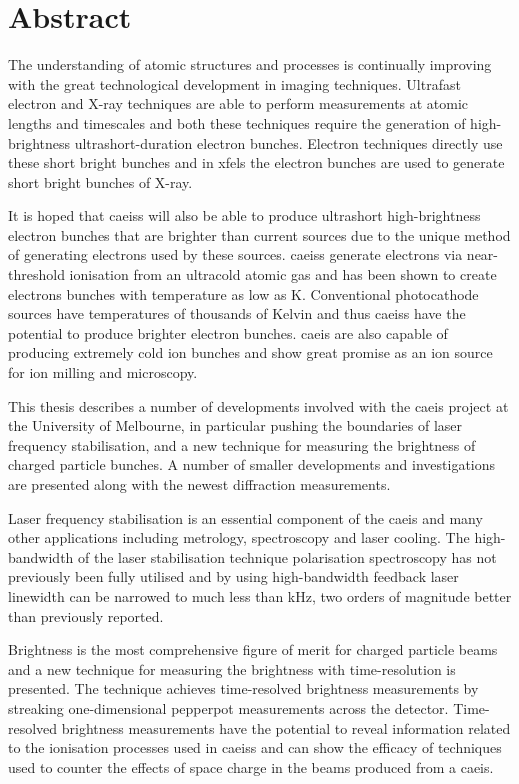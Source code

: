 \chapter*{Abstract}

The understanding of atomic structures and processes is continually improving with the great technological development in imaging techniques.
Ultrafast electron and X-ray techniques are able to perform measurements at atomic lengths and timescales and both these techniques require the generation of high-brightness ultrashort-duration electron bunches.
Electron techniques directly use these short bright bunches and in \glspl{xfel} the electron bunches are used to generate short bright bunches of X-ray.

It is hoped that \glspl{caeis} will also be able to produce ultrashort high-brightness electron bunches that are brighter than current sources due to the unique method of generating electrons used by these sources.
\Glspl{caeis} generate electrons via near-threshold ionisation from an ultracold atomic gas and has been shown to create electrons bunches with temperature as low as \unit[10]{K}.
Conventional photocathode sources have temperatures of thousands of Kelvin and thus \glspl{caeis} have the potential to produce brighter electron bunches.
\Gls{caeis} are also capable of producing extremely cold ion bunches and show great promise as an ion source for ion milling and microscopy.

This thesis describes a number of developments involved with the \gls{caeis} project at the University of Melbourne, in particular pushing the boundaries of laser frequency stabilisation, and a new technique for measuring the brightness of charged particle bunches.
A number of smaller developments and investigations are presented along with the newest diffraction measurements.

Laser frequency stabilisation is an essential component of the \gls{caeis} and many other applications including metrology, spectroscopy and laser cooling.
The high-bandwidth of the laser stabilisation technique polarisation spectroscopy has not previously been fully utilised and by using high-bandwidth feedback laser linewidth can be narrowed to much less than \unit[1]{kHz}, two orders of magnitude better than previously reported.

Brightness is the most comprehensive figure of merit for charged particle beams and a new technique for measuring the brightness with time-resolution is presented.
The technique achieves time-resolved brightness measurements by streaking one-dimensional pepperpot measurements across the detector.
Time-resolved brightness measurements have the potential to reveal information related to the ionisation processes used in \glspl{caeis} and can show the efficacy of techniques used to counter the effects of space charge in the beams produced from a \gls{caeis}.

